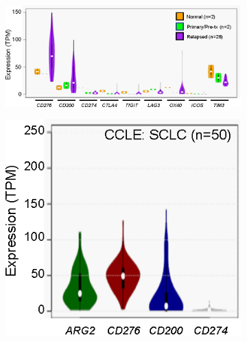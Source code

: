 \begin{figure}[p]
    \vspace{0.1cm}
    \hspace{0.05\textwidth}%
    \begin{subfigure}{0.585\textwidth}
        \includegraphics[width=\linewidth,keepaspectratio]{images/sclc/checkpoint_violin_autopsy}
        \caption{}\label{fig:sclc:checkpoint_violin_autopsy}
    \end{subfigure}%
    \hfill%
    \begin{subfigure}{0.265\textwidth}
        \includegraphics[width=\linewidth,keepaspectratio]{images/sclc/checkpoint_violin_ccle}
        \caption{}\label{fig:sclc:checkpoint_violin_ccle}
    \end{subfigure}%
    \hspace{0.05\textwidth}
    \vspace{-0.5cm}

\end{figure}
